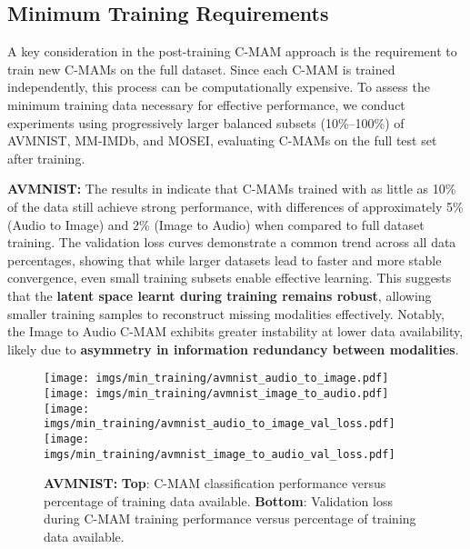 \FloatBarrier

\subsection{Minimum Training Requirements}\label{sec:min_training}
A key consideration in the post-training C-MAM approach is the requirement to train new C-MAMs on the full dataset. Since each C-MAM is trained independently, this process can be computationally expensive. To assess the minimum training data necessary for effective performance, we conduct experiments using progressively larger balanced subsets (10\%–100\%) of AVMNIST, MM-IMDb, and MOSEI, evaluating C-MAMs on the full test set after training.

\textbf{AVMNIST:} The results in  indicate that C-MAMs trained with as little as 10\% of the data still achieve strong performance, with differences of approximately 5\% (Audio to Image) and 2\% (Image to Audio) when compared to full dataset training. The validation loss curves demonstrate a common trend across all data percentages, showing that while larger datasets lead to faster and more stable convergence, even small training subsets enable effective learning. This suggests that the \textbf{latent space learnt during training remains robust}, allowing smaller training samples to reconstruct missing modalities effectively. Notably, the Image to Audio C-MAM exhibits greater instability at lower data availability, likely due to \textbf{asymmetry in information redundancy between modalities}.

\begin{figure}[h!]
    \centering
    \texttt{[image: imgs/min\_training/avmnist\_audio\_to\_image.pdf]}
    \texttt{[image: imgs/min\_training/avmnist\_image\_to\_audio.pdf]}
    \texttt{[image: imgs/min\_training/avmnist\_audio\_to\_image\_val\_loss.pdf]}
    \texttt{[image: imgs/min\_training/avmnist\_image\_to\_audio\_val\_loss.pdf]}
    \caption{\textbf{AVMNIST: }\textbf{Top}: C-MAM classification performance versus percentage of training data available. \textbf{Bottom}: Validation loss during C-MAM training performance versus percentage of training data available.}
    \label{fig:avmnist_min_training}
\end{figure}

